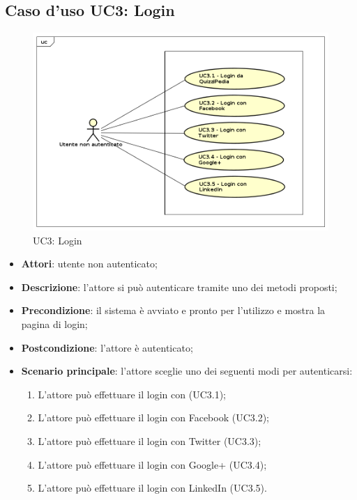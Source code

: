 \newpage
\subsection{Caso d'uso UC3: Login}
\label{UC3}
\begin{figure}
	\centering
	\includegraphics[scale=0.5]{UML/UC3.png}
	\caption{UC3: Login}
\end{figure}
\FloatBarrier
\begin{itemize}
	\item \textbf{Attori}: utente non autenticato;
	\item \textbf{Descrizione}: l'attore si può autenticare tramite uno dei metodi proposti;
	\item \textbf{Precondizione}: il sistema è avviato e pronto per l'utilizzo e mostra la pagina di login;
	\item \textbf{Postcondizione}: l'attore è autenticato;
	\item \textbf{Scenario principale}: l'attore sceglie uno dei seguenti modi per autenticarsi:
		\begin{enumerate}
			\item L'attore può effettuare il login con \progetto (UC3.1);
			\item L'attore può effettuare il login con Facebook (UC3.2);
			\item L'attore può effettuare il login con Twitter (UC3.3);
			\item L'attore può effettuare il login con Google+ (UC3.4);
			\item L'attore può effettuare il login con LinkedIn (UC3.5).
		\end{enumerate}
\end{itemize}

